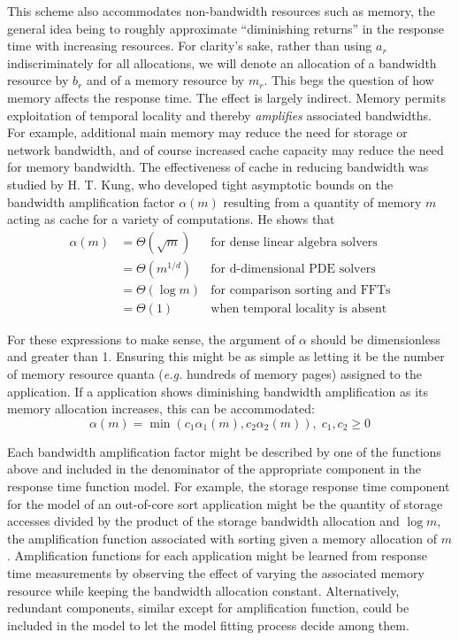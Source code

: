 This scheme also accommodates non-bandwidth resources such as memory,
the general idea being to roughly approximate ``diminishing returns'' in the response time with increasing resources.
For clarity's sake, rather than using $a_r$ indiscriminately for all allocations,
we will denote an allocation of a bandwidth resource by $b_r$ and of a memory resource by $m_r$.
This begs the question of how memory affects the response time.
The effect is largely indirect.
Memory permits exploitation of temporal locality and thereby \emph{amplifies} associated bandwidths.
For example, additional main memory may reduce the need for storage or network bandwidth,
and of course increased cache capacity may reduce the need for memory bandwidth.
The effectiveness of cache in reducing bandwidth was studied by
H. T. Kung\cite{Kung}, who developed tight asymptotic bounds on the bandwidth amplification
factor $\alpha(m)$ resulting from a quantity of memory $m$ acting as cache for a variety of computations.
He shows that
\begin{displaymath}
\begin{array}{lll}
\alpha(m) &= \Theta(\sqrt m) & \mbox{for dense linear algebra solvers} \\
          &= \Theta(m^{1/d}) & \mbox{for d-dimensional PDE solvers} \\
          &= \Theta(\log m)  & \mbox{for comparison sorting and FFTs} \\
          &= \Theta(1)       & \mbox{when temporal locality is absent}
\end{array}
\end{displaymath}

For these expressions to make sense, the argument of $\alpha$ should be dimensionless and greater than 1.
Ensuring this might be as simple as letting it be the number of memory resource quanta
(\emph{e.g.} hundreds of memory pages) assigned to the application.
If a application shows diminishing bandwidth amplification as its memory allocation increases, this can be accommodated:
\begin{displaymath}
\alpha(m) = \min(c_1\alpha_1(m),c_2\alpha_2(m)),\;c_1,c_2 \geq 0
\end{displaymath}

Each bandwidth amplification factor might be described by one of the functions above
and included in the denominator of the appropriate component in the response time function model.
For example, the storage response time component for the model of an out-of-core sort application might be
the quantity of storage accesses divided by the product of the storage bandwidth allocation and $\log m$,
the amplification function associated with sorting given a memory allocation of $m$.
Amplification functions for each application might be learned from response time measurements
by observing the effect of varying the associated memory resource while keeping the bandwidth allocation constant.
Alternatively, redundant components, similar except for amplification function, could be included in the model
to let the model fitting process decide among them.


